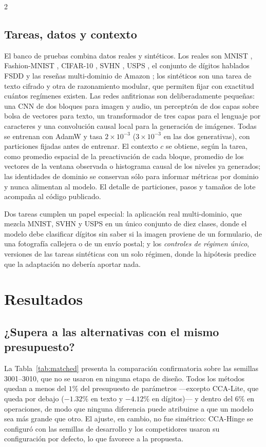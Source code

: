 \begin{multicols}{2}
\subsection{Tareas, datos y contexto}

El banco de pruebas combina datos reales y sintéticos. Los reales son MNIST \cite{lecun1998gradient}, Fashion-MNIST \cite{xiao2017fashion}, CIFAR-10 \cite{krizhevsky2009learning}, SVHN \cite{netzer2011reading}, USPS \cite{hull1994database}, el conjunto de dígitos hablados FSDD \cite{jackson2018fsdd} y las reseñas multi-dominio de Amazon \cite{blitzer2007biographies}; los sintéticos son una tarea de texto cifrado y otra de razonamiento modular, que permiten fijar con exactitud cuántos regímenes existen. Las redes anfitrionas son deliberadamente pequeñas: una CNN de dos bloques para imagen y audio, un perceptrón de dos capas sobre bolsa de vectores para texto, un transformador de tres capas para el lenguaje por caracteres y una convolución causal local para la generación de imágenes. Todas se entrenan con AdamW y tasa $2{\times}10^{-3}$ ($3{\times}10^{-3}$ en las dos generativas), con particiones fijadas antes de entrenar. El contexto $c$ se obtiene, según la tarea, como promedio espacial de la preactivación de cada bloque, promedio de los vectores de la ventana observada o histograma causal de los niveles ya generados; las identidades de dominio se conservan sólo para informar métricas por dominio y nunca alimentan al modelo. El detalle de particiones, pasos y tamaños de lote acompaña al código publicado.

Dos tareas cumplen un papel especial: la aplicación real multi-dominio, que mezcla MNIST, SVHN y USPS en un único conjunto de diez clases, donde el modelo debe clasificar dígitos sin saber si la imagen proviene de un formulario, de una fotografía callejera o de un envío postal; y los \textit{controles de régimen único}, versiones de las tareas sintéticas con un solo régimen, donde la hipótesis predice que la adaptación no debería aportar nada.


\section{Resultados}

\subsection{¿Supera a las alternativas con el mismo presupuesto?}

La Tabla~\ref{tab:matched} presenta la comparación confirmatoria sobre las semillas 3001--3010, que no se usaron en ninguna etapa de diseño. Todos los métodos quedan a menos del $1\%$ del presupuesto de parámetros —excepto CCA-Lite, que queda por debajo ($-1.32\%$ en texto y $-4.12\%$ en dígitos)— y dentro del $6\%$ en operaciones, de modo que ninguna diferencia puede atribuirse a que un modelo sea más grande que otro. El ajuste, en cambio, no fue simétrico: CCA-Hinge se configuró con las semillas de desarrollo y los competidores usaron su configuración por defecto, lo que favorece a la propuesta.


\end{multicols}
